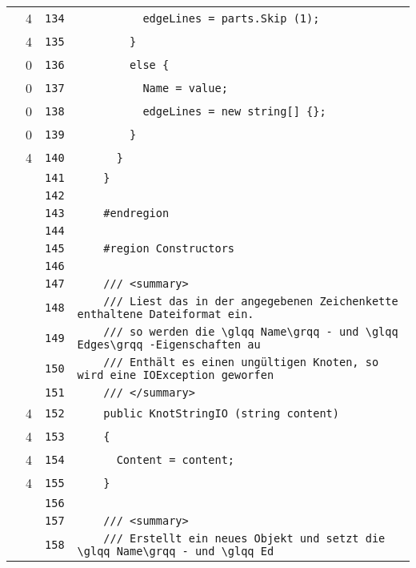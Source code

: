 \documentclass[a4paper,10pt]{article}
\begin{document}
\begin{longtable}[l]{lrrl}
\cellcolor{green} & 4 & \verb~134~ & \verb~          edgeLines = parts.Skip (1);~\\
\cellcolor{green} & 4 & \verb~135~ & \verb~        }~\\
\cellcolor{red} & 0 & \verb~136~ & \verb~        else {~\\
\cellcolor{red} & 0 & \verb~137~ & \verb~          Name = value;~\\
\cellcolor{red} & 0 & \verb~138~ & \verb~          edgeLines = new string[] {};~\\
\cellcolor{red} & 0 & \verb~139~ & \verb~        }~\\
\cellcolor{green} & 4 & \verb~140~ & \verb~      }~\\
\cellcolor{gray} &  & \verb~141~ & \verb~    }~\\
\cellcolor{gray} &  & \verb~142~ & \verb~~\\
\cellcolor{gray} &  & \verb~143~ & \verb~    #endregion~\\
\cellcolor{gray} &  & \verb~144~ & \verb~~\\
\cellcolor{gray} &  & \verb~145~ & \verb~    #region Constructors~\\
\cellcolor{gray} &  & \verb~146~ & \verb~~\\
\cellcolor{gray} &  & \verb~147~ & \verb~    /// <summary>~\\
\cellcolor{gray} &  & \verb~148~ & \verb~    /// Liest das in der angegebenen Zeichenkette enthaltene Dateiformat ein. ~\\
\cellcolor{gray} &  & \verb~149~ & \verb~    /// so werden die \glqq Name\grqq - und \glqq Edges\grqq -Eigenschaften au~\\
\cellcolor{gray} &  & \verb~150~ & \verb~    /// Enthält es einen ungültigen Knoten, so wird eine IOException geworfen ~\\
\cellcolor{gray} &  & \verb~151~ & \verb~    /// </summary>~\\
\cellcolor{green} & 4 & \verb~152~ & \verb~    public KnotStringIO (string content)~\\
\cellcolor{green} & 4 & \verb~153~ & \verb~    {~\\
\cellcolor{green} & 4 & \verb~154~ & \verb~      Content = content;~\\
\cellcolor{green} & 4 & \verb~155~ & \verb~    }~\\
\cellcolor{gray} &  & \verb~156~ & \verb~~\\
\cellcolor{gray} &  & \verb~157~ & \verb~    /// <summary>~\\
\cellcolor{gray} &  & \verb~158~ & \verb~    /// Erstellt ein neues Objekt und setzt die \glqq Name\grqq - und \glqq Ed~\\

\end{longtable}
\end{document}

